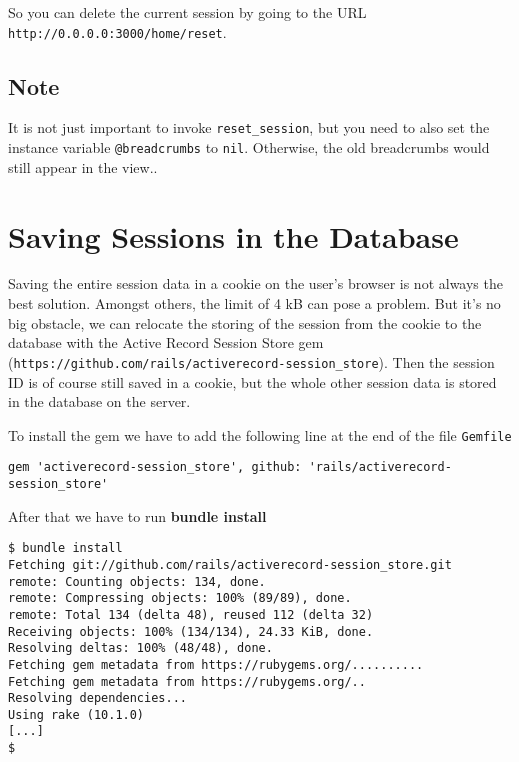 \documentclass[a4paper]{book}
\newcounter{tab}[chapter]
\begin{document}
So you can delete the current session by going to the URL \texttt{http://0.0.0.0:3000/home/reset}.

\subsection{Note}\label{note-45}

It is not just important to invoke \texttt{reset\_session}, but you need to also set the instance variable \texttt{@breadcrumbs} to \texttt{nil}. Otherwise, the old breadcrumbs would still appear in the view..

\section{Saving Sessions in the Database}\label{saving-sessions-in-the-database}

Saving the entire session data in a cookie on the user's browser is not always the best solution. Amongst others, the limit of 4 kB can pose a problem. But it's no big obstacle, we can relocate the storing of the session from the cookie to the database with the Active Record Session Store gem (\texttt{https://github.com/rails/activerecord-session\_store}). Then the session ID is of course still saved in a cookie, but the whole other session data is stored in the database on the server.

To install the gem we have to add the following line at the end of the file \texttt{Gemfile}

\begin{shaded}\begin{verbatim}
gem 'activerecord-session_store', github: 'rails/activerecord-session_store'
\end{verbatim}\end{shaded}

After that we have to run \textbf{bundle install}

\begin{shaded}\begin{verbatim}
$ bundle install
Fetching git://github.com/rails/activerecord-session_store.git
remote: Counting objects: 134, done.
remote: Compressing objects: 100% (89/89), done.
remote: Total 134 (delta 48), reused 112 (delta 32)
Receiving objects: 100% (134/134), 24.33 KiB, done.
Resolving deltas: 100% (48/48), done.
Fetching gem metadata from https://rubygems.org/..........
Fetching gem metadata from https://rubygems.org/..
Resolving dependencies...
Using rake (10.1.0)
[...]
$
\end{verbatim}\end{shaded}
\end{document}
